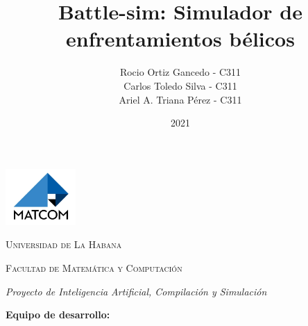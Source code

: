 \documentclass{llncs}
\title{Battle-sim: Simulador de enfrentamientos bélicos}
\author{Rocio Ortiz Gancedo - C311\\Carlos Toledo Silva - C311\\Ariel A. Triana Pérez - C311}
\date{2021}
\begin{document}
\thispagestyle{empty}


\makeatletter

    \begin{titlepage}
        \centering
        
        \includegraphics[width=0.2\textwidth]{chapters/img/logo-matcom.jpg}
        
        \vspace{0.5cm}
        
        {\scshape \LARGE Universidad de La Habana \par}
        {\scshape \Large Facultad de Matemática y Computación \par}
        
        \vspace{6.5cm}
        
        {\bfseries \Huge \textbf{\@title} \par}
        \vspace{0.2cm}
        \textit{Proyecto de Inteligencia Artificial, Compilación y Simulación}
        
        \vfill
        
        \textbf{Equipo de desarrollo:}
        
        \@author
        
        \vspace{1cm}
        
        \@date
    \end{titlepage}

    \tableofcontents

    \mainmatter
    
    
    
    
    
    \backmatter
\end{document}
